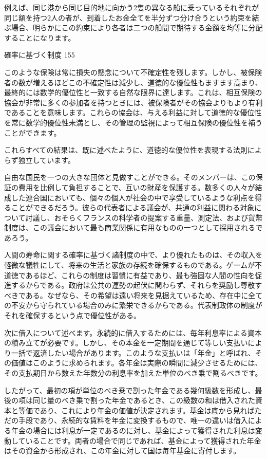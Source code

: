 \documentclass[a4paper,11pt,openany]{ltjsbook}
\begin{document}
例えば、同じ港から同じ目的地に向かう2隻の異なる船に乗っているそれぞれが同じ額を持つ2人の者が、到着したお金全てを半分ずつ分け合うという約束を結ぶ場合、明らかにこの約束により各者は二つの船間で期待する金額を均等に分配することになります。

確率に基づく制度 155

このような保険は常に損失の懸念について不確定性を残します。しかし、被保険者の数が増えるほどこの不確定性は減少し、道徳的な優位性もますます高まり、最終的には数学的優位性と一致する自然な限界に達します。これは、相互保険の協会が非常に多くの参加者を持つときには、被保険者がその協会よりもより有利であることを意味します。これらの協会は、与える利益に対して道徳的な優位性を常に数学的優位性未満とし、その管理の監視によって相互保険の優位性を補うことができます。

これらすべての結果は、既に述べたように、道徳的な優位性を表現する法則によらず独立しています。

自由な国民を一つの大きな団体と見做すことができる。そのメンバーは、この保証の費用を比例して負担することで、互いの財産を保護する。数多くの人々が結成した連合国においても、個々の個人が社会の中で享受しているような利点を得ることができるだろう。彼らの代表者による議会が、共通の利益に関わる対象について討議し、おそらくフランスの科学者の提案する重量、測定法、および貨幣制度は、この議会において最も商業関係に有用なものの一つとして採用されるであろう。

人間の寿命に関する確率に基づく諸制度の中で、より優れたものは、その収入を軽微な犠牲にして、将来の生活と家族の存続を確保するものである。ゲームが不道徳であるほど、これらの制度は習慣に有益であり、最も強固な人間の性向を促進するからである。政府は公共の運勢の起伏に関わらず、それらを奨励し尊敬すべきである。なぜなら、その希望は遠い将来を見据えているため、存在中に全ての不安から守られている場合のみに繁栄できるからである。代表制政体の制度がそれを確保するという点で優位性がある。

次に借入について述べます。永続的に借入するためには、毎年利息率による資本の積み立てが必要です。しかし、その本金を一定期間を通じて等しい支払いにより一括で返済したい場合があります。このような支払いは「年金」と呼ばれ、その価値はこのように求められます。各年金は実際の瞬間に減少させるためには、その支払期日から数えた年数分の利息率を加えた単位のべき乗で割るべきです。

したがって、最初の項が単位のべき乗で割った年金である幾何級数を形成し、最後の項は同じ量のべき乗で割った年金であるとき、この級数の和は借入された資本と等価であり、これにより年金の価値が決定されます。基金は底から見ればただの手段であり、永続的な賃料を年金に変換するもので、唯一の違いは借入による年金の場合には利息が一定であるのに対し、基金によって獲得された利息は変動していることです。両者の場合で同じであれば、基金によって獲得された年金はその資金から形成され、この年金に対して国は毎年基金に寄付します。
\end{document}
